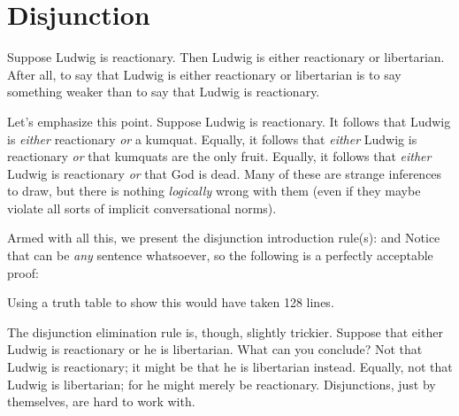 \section{Disjunction}
Suppose Ludwig is reactionary. Then Ludwig is either reactionary or libertarian. After all, to say that Ludwig is either reactionary or libertarian is to say something weaker than to say that Ludwig is reactionary.

Let's emphasize this point. Suppose Ludwig is reactionary. It follows that Ludwig is \emph{either} reactionary \emph{or} a kumquat. Equally, it follows that \emph{either} Ludwig is reactionary \emph{or} that kumquats are the only fruit.  Equally, it follows that \emph{either} Ludwig is reactionary \emph{or} that God is dead. Many of these are strange inferences to draw, but there is nothing \emph{logically} wrong with them (even if they maybe violate all sorts of implicit conversational norms).

Armed with all this, we present the disjunction introduction rule(s):
and
Notice that  can be \emph{any} sentence whatsoever, so the following is a perfectly acceptable proof:
\begin{fitchproof}
\end{fitchproof}
Using a truth table to show this would have taken 128 lines.

The disjunction elimination rule is, though, slightly trickier. Suppose that either Ludwig is reactionary or he is libertarian. What can you conclude? Not that Ludwig is reactionary; it might be that he is libertarian instead. Equally, not that Ludwig is libertarian; for he might merely be reactionary. Disjunctions, just by themselves, are hard to work with.

